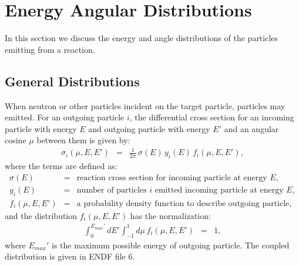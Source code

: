 \section{Energy Angular Distributions}
In this section we discuss the energy and angle distributions of the particles emitting from a reaction. 

\subsection{General Distributions}
When neutron or other particles incident on the target particle, particles may emitted. For an outgoing particle $i$, the differential cross section for an incoming particle with energy $E$ and outgoing particle with energy $E'$ and an angular cosine $\mu$ between them is given by:
\begin{eqnarray}
\label{eq:cfs_diff_xsec}
\sigma_i(\mu,E,E') &=& \frac{1}{2\pi}\,\sigma(E)\,y_i(E)\,f_i(\mu,E,E'),
\end{eqnarray}
where the terms are defined as:
\begin{eqnarray}
\sigma(E) &=& \mbox{reaction cross section for incoming particle at energy $E$},\\
y_i(E) &=& \mbox{number of particles $i$ emitted  incoming particle at energy $E$},\\
f_i(\mu,E,E') &=& \mbox{a probability density function to describe outgoing particle},
\end{eqnarray}
and the distribution $f_i(\mu,E,E')$ has the normalization:
\begin{eqnarray}
\int_{0}^{E_{max}'}dE'\int_{-1}^{1}d\mu\, f_i(\mu,E,E') &=& 1,
\end{eqnarray}
where $E_{max}'$ is the maximum possible energy of outgoing particle. The coupled distribution is given in ENDF file 6.


